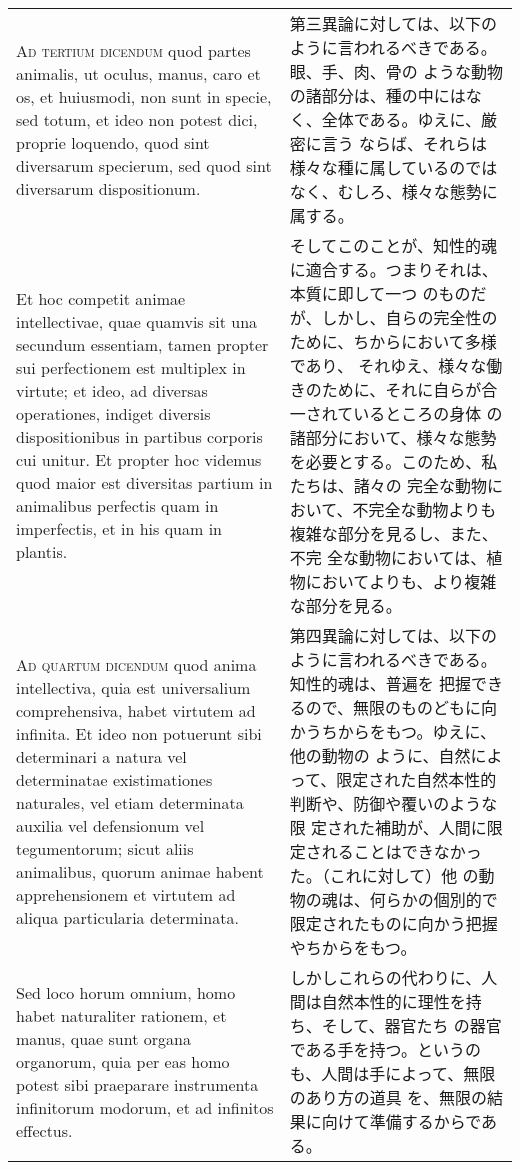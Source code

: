 \documentclass[paper=a4paper,fontsize=10pt,jafontsize=9pt,titlepage]{jlreq}
\begin{document}
\begin{longtable}{p{21em}p{21em}}
\\

{\scshape Ad tertium dicendum} quod partes animalis, ut oculus, manus,
caro et os, et huiusmodi, non sunt in specie, sed totum, et ideo non
potest dici, proprie loquendo, quod sint diversarum specierum, sed
quod sint diversarum dispositionum.
 
&

 第三異論に対しては、以下のように言われるべきである。眼、手、肉、骨の
 ような動物の諸部分は、種の中にはなく、全体である。ゆえに、厳密に言う
 ならば、それらは様々な種に属しているのではなく、むしろ、様々な態勢に
 属する。
 
\\

Et hoc competit animae intellectivae, quae quamvis sit una secundum
essentiam, tamen propter sui perfectionem est multiplex in virtute; et
ideo, ad diversas operationes, indiget diversis dispositionibus in
partibus corporis cui unitur. Et propter hoc videmus quod maior est
diversitas partium in animalibus perfectis quam in imperfectis, et in
his quam in plantis.
 
&

 そしてこのことが、知性的魂に適合する。つまりそれは、本質に即して一つ
 のものだが、しかし、自らの完全性のために、ちからにおいて多様であり、
 それゆえ、様々な働きのために、それに自らが合一されているところの身体
 の諸部分において、様々な態勢を必要とする。このため、私たちは、諸々の
 完全な動物において、不完全な動物よりも複雑な部分を見るし、また、不完
 全な動物においては、植物においてよりも、より複雑な部分を見る。
 
\\




 {\scshape Ad quartum dicendum} quod anima intellectiva, quia est
 universalium comprehensiva, habet virtutem ad infinita. Et ideo non
 potuerunt sibi determinari a natura vel determinatae existimationes
 naturales, vel etiam determinata auxilia vel defensionum vel
 tegumentorum; sicut aliis animalibus, quorum animae habent
 apprehensionem et virtutem ad aliqua particularia determinata.

&

第四異論に対しては、以下のように言われるべきである。知性的魂は、普遍を
把握できるので、無限のものどもに向かうちからをもつ。ゆえに、他の動物の
ように、自然によって、限定された自然本性的判断や、防御や覆いのような限
定された補助が、人間に限定されることはできなかった。（これに対して）他
の動物の魂は、何らかの個別的で限定されたものに向かう把握やちからをもつ。
 
\\


 Sed loco horum omnium, homo habet naturaliter rationem, et manus,
 quae sunt organa organorum, quia per eas homo potest sibi praeparare
 instrumenta infinitorum modorum, et ad infinitos effectus.

&

しかしこれらの代わりに、人間は自然本性的に理性を持ち、そして、器官たち
の器官である手を持つ。というのも、人間は手によって、無限のあり方の道具
を、無限の結果に向けて準備するからである。

\end{longtable}
\newpage
\end{document}
